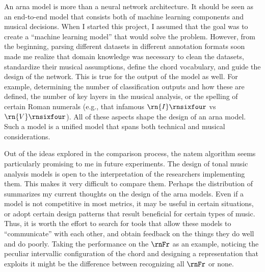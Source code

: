
An \gls{arna} model is more than a neural network
architecture. It should be seen as an end-to-end model that
consists both of machine learning components and musical
decisions. When I started this project, I assumed that the
goal was to create a ``machine learning model'' that would
solve the problem. However, from the beginning, parsing
different datasets in different annotation formats soon made
me realize that domain knowledge was necessary to clean the
datasets, standardize their musical assumptions, define the
chord vocabulary, and guide the design of the network. This
is true for the output of the model as well. For example,
determining the number of classification outputs and how
these are defined, the number of key layers in the musical
analysis, or the spelling of certain Roman numerals (e.g.,
that infamous $\rn{I}\rnsixfour$ vs $\rn{V}\rnsixfour$). All
of these aspects shape the design of an \gls{arna} model.
Such a model is a unified model that spans both technical
and musical considerations.

Out of the ideas explored in the comparison process, the
\gls{natem} algorithm seems particularly promising to me in
future experiments. The design of tonal music analysis
models is open to the interpretation of the researchers
implementing them. This makes it very difficult to compare
them. Perhaps the distribution of 
summarizes my current thoughts on the design of the
\gls{arna} models. Even if a model is not competitive in
most metrics, it may be useful in certain situations, or
adopt certain design patterns that result beneficial for
certain types of music. Thus, it is worth the effort to
search for tools that allow these models to ``communicate''
with each other, and obtain feedback on the things they do
well and do poorly. Taking the performance on the $\rnFr$ as
an example, noticing the peculiar intervallic configuration
of the chord and designing a representation that exploits it
might be the difference between recognizing all $\rnFr$ or
none.


